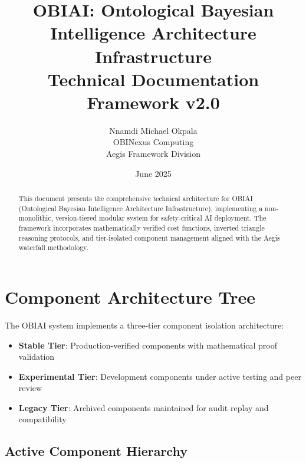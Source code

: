 \documentclass[11pt,letterpaper]{article}
\title{OBIAI: Ontological Bayesian Intelligence Architecture Infrastructure\\
\large Technical Documentation Framework v2.0}
\author{Nnamdi Michael Okpala\\
OBINexus Computing\\
Aegis Framework Division}
\date{June 2025}
\begin{document}
\maketitle

\begin{abstract}
This document presents the comprehensive technical architecture for OBIAI (Ontological Bayesian Intelligence Architecture Infrastructure), implementing a non-monolithic, version-tiered modular system for safety-critical AI deployment. The framework incorporates mathematically verified cost functions, inverted triangle reasoning protocols, and tier-isolated component management aligned with the Aegis waterfall methodology.
\end{abstract}

\tableofcontents
\newpage

\section{Component Architecture Tree}
\label{sec:architecture}

The OBIAI system implements a three-tier component isolation architecture:

\begin{itemize}
    \item \textbf{Stable Tier}: Production-verified components with mathematical proof validation
    \item \textbf{Experimental Tier}: Development components under active testing and peer review
    \item \textbf{Legacy Tier}: Archived components maintained for audit replay and compatibility
\end{itemize}

\subsection{Active Component Hierarchy}
\end{document}
